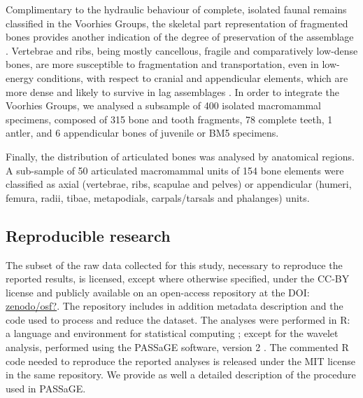 \documentclass[review,times,authoryear]{elsarticle} %
\begin{document}
Complimentary to the hydraulic behaviour of complete, isolated faunal remains classified in the Voorhies Groups, the skeletal part representation of fragmented bones provides another indication of the degree of preservation of the assemblage \citep{Dominguez-Rodrigo2014,Dominguez-Rodrigo2017,Pante2010}. Vertebrae and ribs, being mostly cancellous, fragile and comparatively low-dense bones, are more susceptible to fragmentation and transportation, even in low-energy conditions, with respect to cranial and appendicular elements, which are more dense and likely to survive in lag assemblages \citep{Dominguez-Rodrigo2017}. In order to integrate the Voorhies Groups, we analysed a subsample of 400 isolated macromammal specimens, composed of 315 bone and tooth fragments, 78 complete teeth, 1 antler, and 6 appendicular bones of juvenile or BM5 specimens.

Finally, the distribution of articulated bones was analysed by anatomical regions. A sub-sample of 50 articulated macromammal units of 154 bone elements were classified as axial (vertebrae, ribs, scapulae and pelves) or appendicular (humeri, femura, radii, tibae, metapodials, carpals/tarsals and phalanges) units.


\subsection{Reproducible research}

The subset of the raw data collected for this study, necessary to reproduce the reported results, is licensed, except where otherwise specified, under the CC-BY license and publicly available on an open-access repository at the DOI: \href{https://doi.org/}{zenodo/osf?}. The repository includes in addition metadata description and the code used to process and reduce the dataset.
The analyses were performed in \textsf{R}: a language and environment for statistical computing \citep{RCoreTeam2017}; except for the wavelet analysis, performed using the PASSaGE software, version 2 \citep{Rosenberg2011}. The commented \textsf{R} code needed to reproduce the reported analyses is released under the MIT license in the same repository. We provide as well a detailed description of the procedure used in PASSaGE.
\end{document}
